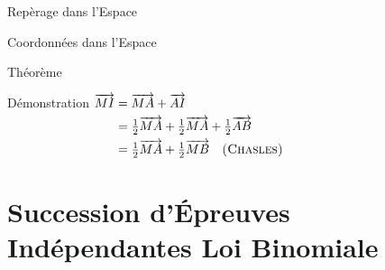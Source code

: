 \documentclass{coursbook}
\begin{document}
\begin{Gpartie}{Repèrage dans l'Espace}
\begin{Spartie}{Coordonnées dans l'Espace}
\begin{SSpartie}{Théorème}
                \begin{SSSpartie}{Démonstration} 
                    $\begin{aligned}[t]
                        \overrightarrow{MI}&=\overrightarrow{MA}+\overrightarrow{AI} \\
                        &=\tfrac{1}{2}\overrightarrow{MA}+\tfrac{1}{2}\overrightarrow{MA}+\tfrac{1}{2}\overrightarrow{AB} \\
                        &=\tfrac{1}{2}\overrightarrow{MA}+\tfrac{1}{2}\overrightarrow{MB}\quad\textsc{(Chasles)}
                    \end{aligned}$
                \end{SSSpartie}
            \end{SSpartie}
        \end{Spartie}
    \end{Gpartie}



    \chapter{Succession d'Épreuves Indépendantes Loi Binomiale}
\end{document}

